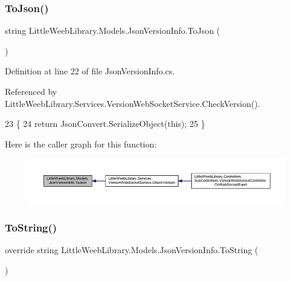 \subsubsection{\texorpdfstring{To\+Json()}{ToJson()}}
{\footnotesize\ttfamily string Little\+Weeb\+Library.\+Models.\+Json\+Version\+Info.\+To\+Json (\begin{DoxyParamCaption}{ }\end{DoxyParamCaption})}



Definition at line 22 of file Json\+Version\+Info.\+cs.



Referenced by Little\+Weeb\+Library.\+Services.\+Version\+Web\+Socket\+Service.\+Check\+Version().


\begin{DoxyCode}
23         \{
24             \textcolor{keywordflow}{return} JsonConvert.SerializeObject(\textcolor{keyword}{this});
25         \}
\end{DoxyCode}
Here is the caller graph for this function\+:\nopagebreak
\begin{figure}[H]
\begin{center}
\leavevmode
\includegraphics[width=350pt]{class_little_weeb_library_1_1_models_1_1_json_version_info_a79b72a4b31accba79e2fbf1ca93297c4_icgraph}
\end{center}
\end{figure}
\mbox{\label{class_little_weeb_library_1_1_models_1_1_json_version_info_a72efae30c86f1e6baaef42065127bdd2}} 
\subsubsection{\texorpdfstring{To\+String()}{ToString()}}
{\footnotesize\ttfamily override string Little\+Weeb\+Library.\+Models.\+Json\+Version\+Info.\+To\+String (\begin{DoxyParamCaption}{ }\end{DoxyParamCaption})}




